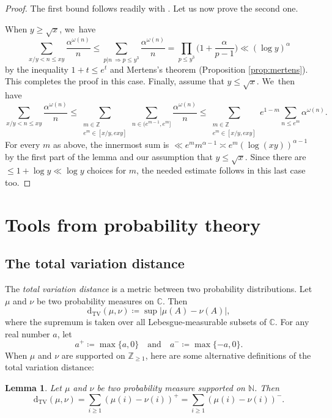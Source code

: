 \documentclass[JEP,XML,SOM,Unicode,published]{cedram}
\newcommand{\NN}{\mathbb{N}}
\newcommand{\ZZ}{\mathbb{Z}}
\newcommand{\CC}{\mathbb{C}}
\newcommand{\dtv}{\mathrm{d}_{\mathrm{TV}}}
\newcommand{\bgg}{\Big}
\theoremstyle{plain}
\newtheorem{lem}[cor]{Lemma}
\theoremstyle{definition}
\begin{document}
\begin{proof}The first bound follows readily with \cite[Th.\,14.2]{Koukoulo19}. Let us now prove the second one.

When $y\ge \sqrt{x}$, we~have
\[
\sum_{x/y<n \le xy} \frac{ \alpha^{\omega(n)}}{n}\le \sum_{p|n\ \Rightarrow p \le y^3} \frac{ \alpha^{\omega(n)}}{n} = \prod_{p\le y^3} \bgg(1+\frac{\alpha}{p-1}\bgg) \ll (\log y)^\alpha
\]
by the inequality $1+t\le e^t$ and Mertens's theorem (Proposition \ref{prop:mertens}). This completes the proof in this case. Finally, assume that $y\le \sqrt{x}$. We~then have
\[
\sum_{x/y<n \le xy} \frac{ \alpha^{\omega(n)}}{n}
\le \sum_{\substack{m\in\ZZ \\ e^m\in[x/y,exy]}} \sum_{n\in(e^{m-1},e^m]} \frac{ \alpha^{\omega(n)}}{n}
\le \sum_{\substack{m\in\ZZ \\ e^m\in[x/y,exy]}} e^{1-m} \sum_{n\le e^m} \alpha^{\omega(n)}.
\]
For every $m$ as above, the innermost sum is $\ll e^m m^{\alpha-1} \asymp e^m (\log(xy))^{\alpha-1}$ by the first part of the lemma and our assumption that $y\le \sqrt{x}$. Since there are $\le1+\log y\ll \log y$ choices for $m$, the needed estimate follows in this last case too.
\end{proof}

\section{Tools from probability theory}

\subsection{The total variation distance}

The \textit{total variation distance} is a metric between two probability distributions. Let $\mu$ and $\nu$ be two probability measures on $\CC$. Then
\begin{equation}
\label{eq:dtv dfn}
\dtv(\mu, \nu) \coloneqq \sup |\mu(A) - \nu(A)|,
\end{equation}
where the supremum is taken over all Lebesgue-measurable subsets of $\CC$. For any real number $a$, let
\[
a^+ \coloneqq \max\{a, 0\} \quad \text{and} \quad a^- \coloneqq \max\{-a, 0\}.
\]When $\mu$ and $\nu$ are supported on $\ZZ_{\ge 1}$, here are some alternative definitions of the total variation distance:
\begin{lem}
\label{lem:equiv-def-dtv}
Let $\mu$ and $\nu$ be two probability measure supported on $\NN$. Then
\[
\dtv(\mu, \nu) = \sum_{i \ge 1} (\mu(i) - \nu(i))^+ = \sum_{i \ge 1} (\mu(i) - \nu(i))^-.
\]
\end{lem}
\end{document}
